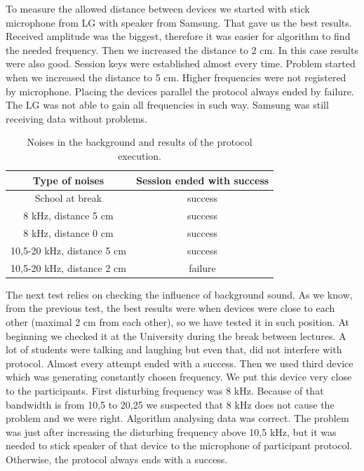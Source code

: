 \documentclass[11pt,titlepage]{article}
\theoremstyle{plain}
\begin{document}
To measure the allowed distance between devices we started with stick microphone from LG with speaker from Samsung. That gave us the best results. Received amplitude was the biggest, therefore it was easier for algorithm to find the needed frequency. Then we increased the distance to 2 cm. In this case results were also good. Session keys were established almost every time. Problem started when we increased the distance to 5 cm. Higher frequencies were not registered by microphone. Placing the devices parallel the protocol always ended by failure. The LG was not able to gain all frequencies in such way. Samsung was still receiving data without problems. 

\vspace{5mm}

	\begin{table}[H]
		\centering
		\begin{tabular}{| c | c |}
			\hline
			Type of noises & Session ended with success \\
			\hline
			School at break & success \\
			\hline
			8 kHz, distance 5 cm & success \\
			\hline
			8 kHz, distance 0 cm & success \\
			\hline
			10,5-20 kHz, distance 5 cm & success \\
			\hline
			10,5-20 kHz, distance 2 cm & failure \\
			\hline
		\end{tabular}
		\caption{Noises in the background and results of the protocol execution.}
	\end{table}

The next test relies on checking the influence of background sound. As we know, from the previous test, the best results were when devices were close to each other (maximal 2 cm from each other), so we have tested it in such position. At beginning we checked it at the University during the break between lectures. A lot of students were talking and laughing but even that, did not interfere with protocol. Almost every attempt ended with a success. Then we used third device which was generating constantly chosen frequency. We put this device very close to the participants. First disturbing frequency was 8 kHz. Because of that bandwidth is from 10,5 to 20,25 we suspected that 8 kHz does not cause the problem and we were right. Algorithm analysing data was correct. The problem was just after increasing the disturbing frequency above 10,5 kHz, but it was needed to stick speaker of that device to the microphone of participant protocol. Otherwise, the protocol always ends with a success. 
\end{document}
